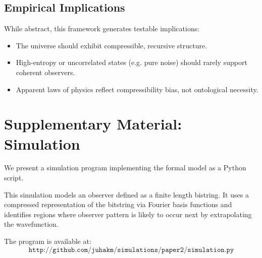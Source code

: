 \documentclass[11pt]{article}
\begin{document}
\subsection{Empirical Implications}

While abstract, this framework generates testable implications:

\begin{itemize}
    \item The universe should exhibit compressible, recursive structure.
    \item High-entropy or uncorrelated states (e.g. pure noise) should rarely support coherent observers.
    \item Apparent laws of physics reflect compressibility bias, not ontological necessity.
\end{itemize}


\section{Supplementary Material: Simulation}

We present a simulation program implementing the formal model as a Python script.

This simulation models an observer defined as a finite length bistring. It uses a compressed representation of the bitstring via Fourier basis functions and identifies regions where observer pattern is likely to occur next by extrapolating the wavefunction.


The program is available at:
\[
    \texttt{http://github.com/juhakm/simulations/paper2/simulation.py}
\]
\end{document}
